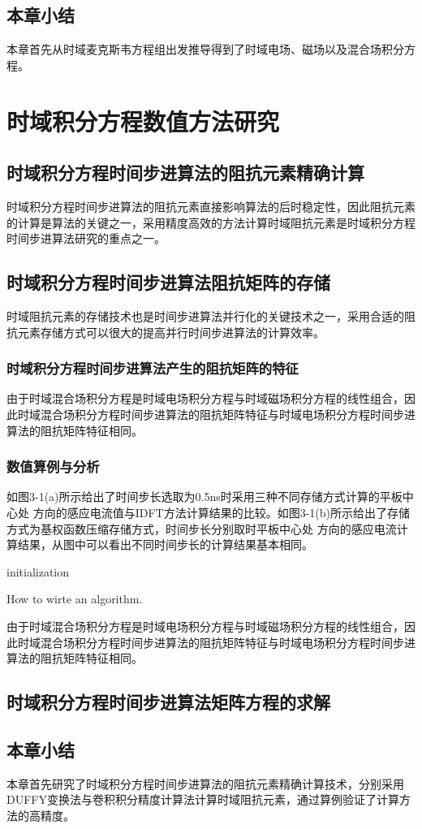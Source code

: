 \section{本章小结}
本章首先从时域麦克斯韦方程组出发推导得到了时域电场、磁场以及混合场积分方程。

\chapter{时域积分方程数值方法研究}
\section{时域积分方程时间步进算法的阻抗元素精确计算}
时域积分方程时间步进算法的阻抗元素直接影响算法的后时稳定性，因此阻抗元素的计算是算法的关键之一，采用精度高效的方法计算时域阻抗元素是时域积分方程时间步进算法研究的重点之一。

\section{时域积分方程时间步进算法阻抗矩阵的存储}
时域阻抗元素的存储技术也是时间步进算法并行化的关键技术之一，采用合适的阻抗元素存储方式可以很大的提高并行时间步进算法的计算效率。

\subsection{时域积分方程时间步进算法产生的阻抗矩阵的特征}
由于时域混合场积分方程是时域电场积分方程与时域磁场积分方程的线性组合，因此时域混合场积分方程时间步进算法的阻抗矩阵特征与时域电场积分方程时间步进算法的阻抗矩阵特征相同。

\subsection{数值算例与分析}

如图3-1(a)所示给出了时间步长选取为0.5ns时采用三种不同存储方式计算的平板中心处 方向的感应电流值与IDFT方法计算结果的比较。如图3-1(b)所示给出了存储方式为基权函数压缩存储方式，时间步长分别取时平板中心处 方向的感应电流计算结果，从图中可以看出不同时间步长的计算结果基本相同。

\begin{algorithm}[H]
	initialization\;
\caption{How to wirte an algorithm.}
\end{algorithm}

由于时域混合场积分方程是时域电场积分方程与时域磁场积分方程的线性组合，因此时域混合场积分方程时间步进算法的阻抗矩阵特征与时域电场积分方程时间步进算法的阻抗矩阵特征相同。

\section{时域积分方程时间步进算法矩阵方程的求解}

\section{本章小结}
本章首先研究了时域积分方程时间步进算法的阻抗元素精确计算技术，分别采用DUFFY变换法与卷积积分精度计算法计算时域阻抗元素，通过算例验证了计算方法的高精度。
